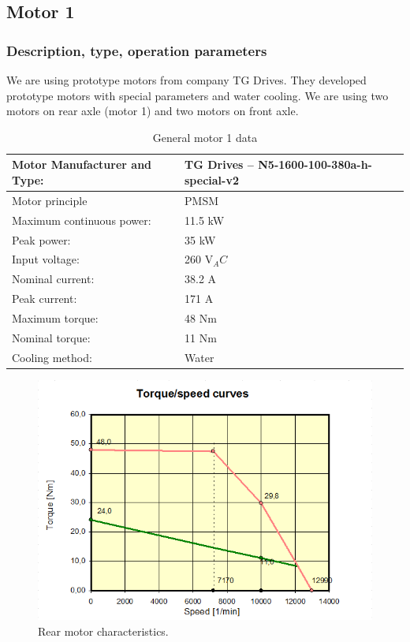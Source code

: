 \subsection{Motor 1}

\subsubsection{Description, type, operation parameters}

We are using prototype motors from company TG Drives. They developed prototype motors with special parameters and water cooling. We are using two motors on rear axle (motor 1) and two motors on front axle.
\begin{table}[H]
	\centering
	\caption{General motor 1 data}
	\begin{tabu}{|X|X|}\hline
		Motor Manufacturer and Type: & TG Drives – N5-1600-100-380a-h-special-v2 \\\hline
		Motor principle & PMSM \\\hline
		Maximum continuous power: & 11.5 kW \\\hline
		Peak power: & 35 kW \\\hline
		Input voltage: & 260 V$_AC$ \\\hline
		Nominal current: & 38.2 A \\\hline
		Peak current: & 171 A \\\hline
		Maximum torque: & 48 Nm \\\hline
		Nominal torque: & 11 Nm \\\hline
		Cooling method: & Water \\\hline
	\end{tabu}%
	\label{tab:motors1-general}%
\end{table}%

\begin{figure}[H]
	\centering
	\includegraphics[width=\textwidth]{./img/MOTOR1-torque.png}
	\caption{Rear motor characteristics.}
	\label{fig:torque1}
\end{figure}

